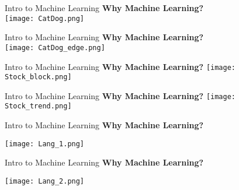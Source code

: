 \documentclass{beamer}
\begin{document}
\begin{frame}[fragile]{Intro to Machine Learning}
    \textbf{Why Machine Learning?}\\
    \texttt{[image: CatDog.png]}%
\end{frame}
\begin{frame}[fragile]{Intro to Machine Learning}
    \textbf{Why Machine Learning?}\\
    \texttt{[image: CatDog\_edge.png]}%
\end{frame}
\begin{frame}[fragile]{Intro to Machine Learning}
    \textbf{Why Machine Learning?}
    \texttt{[image: Stock\_block.png]}
\end{frame}
\begin{frame}[fragile]{Intro to Machine Learning}
    \textbf{Why Machine Learning?}
    \texttt{[image: Stock\_trend.png]}
\end{frame}
\begin{frame}[fragile]{Intro to Machine Learning}
    \textbf{Why Machine Learning?}
    \begin{center}
        \texttt{[image: Lang\_1.png]}
    \end{center}
\end{frame}
\begin{frame}[fragile]{Intro to Machine Learning}
    \textbf{Why Machine Learning?}
    \begin{center}
        \texttt{[image: Lang\_2.png]}
    \end{center}
\end{frame}
\end{document}
